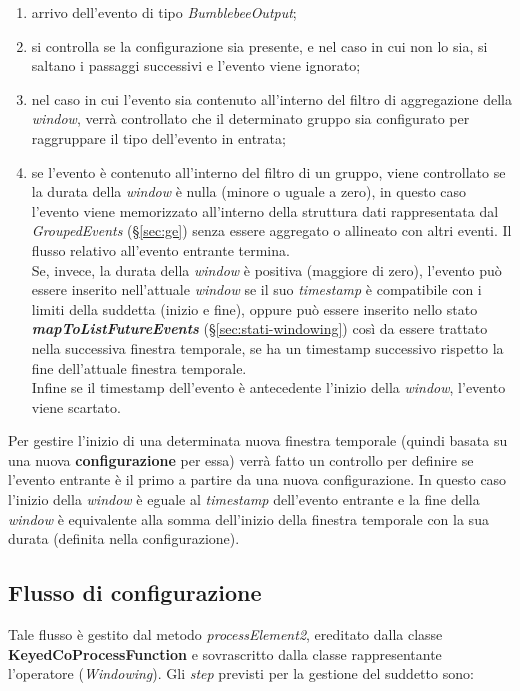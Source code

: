 \begin{enumerate}
	\item{arrivo dell'evento di tipo \textit{BumblebeeOutput};}
	\item{si controlla se la configurazione sia presente, e nel caso in cui non lo sia, si saltano i passaggi successivi e l'evento viene ignorato;}
	\item{nel caso in cui l'evento sia contenuto all'interno del filtro di aggregazione della \textit{window}, verrà controllato che il determinato gruppo sia configurato per raggruppare il tipo dell'evento in entrata;}
\item{se l'evento è contenuto all'interno del filtro di un gruppo, viene controllato se la durata della \textit{window} è nulla (minore o uguale a zero), in questo caso l'evento viene memorizzato all'interno della struttura dati rappresentata dal \textit{GroupedEvents} (\S\ref{sec:ge}) senza essere aggregato o allineato con altri eventi. Il flusso relativo all'evento entrante termina.\\
Se, invece, la durata della \textit{window} è positiva (maggiore di zero), l'evento può essere inserito nell'attuale \textit{window} se il suo \textit{\gls{timestamp}} è compatibile con i limiti della suddetta (inizio e fine), oppure può essere inserito nello stato \textbf{\textit{mapToListFutureEvents}} (\S\ref{sec:stati-windowing}) così da essere trattato nella successiva finestra temporale, se ha un \gls{timestamp} successivo rispetto la fine dell'attuale finestra temporale.\\
Infine se il \gls{timestamp} dell'evento è antecedente l'inizio della \textit{window}, l'evento viene scartato.}
\end{enumerate}

Per gestire l'inizio di una determinata nuova finestra temporale (quindi basata su una nuova \textbf{configurazione} per essa) verrà fatto un controllo per definire se l'evento entrante è il primo a partire da una nuova configurazione. In questo caso l'inizio della \textit{window} è eguale al \textit{\gls{timestamp}} dell'evento entrante e la fine della \textit{window} è equivalente alla somma dell'inizio della finestra temporale con la sua durata (definita nella configurazione).
\subsection{Flusso di configurazione}\label{sec:pr2-windowing}
Tale flusso è gestito dal metodo \textit{processElement2}, ereditato dalla classe \textbf{KeyedCoProcessFunction} e sovrascritto dalla classe rappresentante l'operatore (\textit{Windowing}). Gli \textit{step} previsti per la gestione del suddetto sono:


